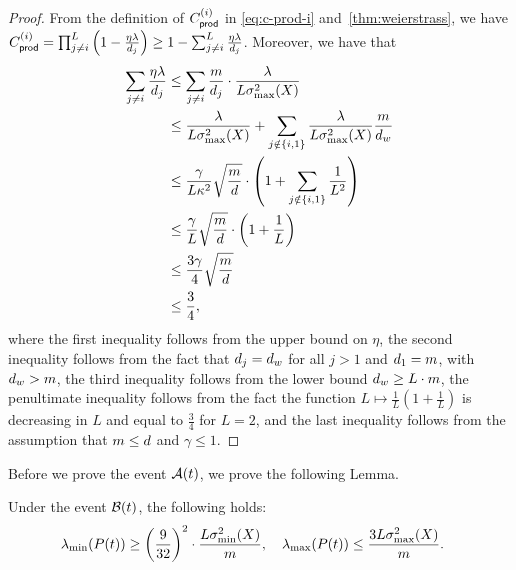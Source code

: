 \begin{proof}
    From the definition of $C_{\mathsf{prod}}^{({i})}$ in \cref{eq:c-prod-i} and~\cref{thm:weierstrass}, we have $C_{\mathsf{prod}}^{({i})} = \prod_{j \neq i}^{L} \left(1 - \frac{\eta \lambda}{d_j}\right) \geq
    1 - \sum_{j \neq i}^{L} \frac{\eta \lambda}{d_j}$. Moreover, we have that
    \begin{align*}
      \sum_{j \neq i} \frac{\eta \lambda}{d_j} &\leq
      \sum_{j \neq i} \frac{m}{d_j} \cdot \frac{\lambda}{L \sigma_{\max}^2(X)} \\
                                               &\leq
                                               \frac{\lambda}{L \sigma_{\max}^2(X)} + \sum_{j \notin \{i, 1\}} \frac{\lambda}{L \sigma_{\max}^2(X)} \frac{m}{d_{w}} \\
                                               &\leq
      \frac{\gamma}{L \kappa^2} \sqrt{\frac{m}{d}} \cdot \left(
        1 + \sum_{j \notin \{i, 1\}} \frac{1}{L^2}
      \right) \\
                                               &\leq
                                               \frac{\gamma}{L} \sqrt{\frac{m}{d}} \cdot \left(1 + \frac{1}{L}\right) \\
                                               &\leq \frac{3 \gamma}{4} \sqrt{\frac{m}{d}} \\
                                               &\leq \frac{3}{4},
    \end{align*}
    where the first inequality follows from the upper bound on $\eta$, the second inequality follows
    from the fact that $d_j = d_{w}$ for all $j > 1$ and $d_1 = m$, with $d_{w} > m$, the
    third inequality follows from the lower bound $d_{w} \geq L \cdot m$, the penultimate inequality
    follows from the fact the function $L \mapsto \frac{1}{L} \left(1 + \frac{1}{L}\right)$ is
    decreasing in $L$ and equal to $\frac{3}{4}$ for $L = 2$, and the last inequality
    follows from the assumption that $m \leq d$ and $\gamma \leq 1$.
\end{proof}
Before we prove the event $\mathcal{A}(t)$, we prove the following Lemma.
\begin{lemma}
  \label{lemma:Pt-extreme-eigenvalues}
  Under the event $\mathcal{B}(t)$, the following holds:
  \begin{align*}
    \lambda_{\min}(P(t)) &\geq
    \left(\frac{9}{32}\right)^2 \cdot \frac{L \sigma_{\min}^2(X)}{m}, \quad
    \lambda_{\max}(P(t)) \leq
    \frac{3 L \sigma_{\max}^2(X)}{m}.
  \end{align*}
\end{lemma}
